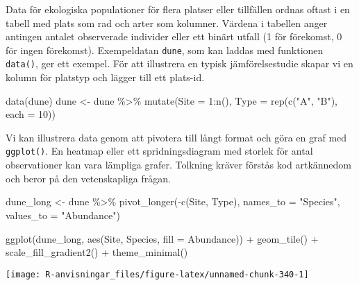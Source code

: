 \documentclass[
]{book}
\newenvironment{Shaded}{\begin{snugshade}}{\end{snugshade}}
\newcommand{\AttributeTok}[1]{\textcolor[rgb]{0.77,0.63,0.00}{#1}}
\newcommand{\DecValTok}[1]{\textcolor[rgb]{0.00,0.00,0.81}{#1}}
\newcommand{\FunctionTok}[1]{\textcolor[rgb]{0.00,0.00,0.00}{#1}}
\newcommand{\NormalTok}[1]{#1}
\newcommand{\OtherTok}[1]{\textcolor[rgb]{0.56,0.35,0.01}{#1}}
\newcommand{\SpecialCharTok}[1]{\textcolor[rgb]{0.00,0.00,0.00}{#1}}
\newcommand{\StringTok}[1]{\textcolor[rgb]{0.31,0.60,0.02}{#1}}
\theoremstyle{definition}
\theoremstyle{definition}
\theoremstyle{definition}
\theoremstyle{definition}
\theoremstyle{remark}
\begin{document}
Data för ekologiska populationer för flera platser eller tillfällen ordnas oftast i en tabell med plats som rad och arter som kolumner. Värdena i tabellen anger antingen antalet observerade individer eller ett binärt utfall (1 för förekomst, 0 för ingen förekomst). Exempeldatan \texttt{dune}, som kan laddas med funktionen \texttt{data()}, ger ett exempel. För att illustrera en typisk jämförelsestudie skapar vi en kolumn för platstyp och lägger till ett plats-id.

\begin{Shaded}
\begin{Highlighting}[]
\FunctionTok{data}\NormalTok{(dune)}
\NormalTok{dune }\OtherTok{\textless{}{-}}\NormalTok{ dune }\SpecialCharTok{\%\textgreater{}\%} 
  \FunctionTok{mutate}\NormalTok{(}\AttributeTok{Site =} \DecValTok{1}\SpecialCharTok{:}\FunctionTok{n}\NormalTok{(), }
         \AttributeTok{Type =} \FunctionTok{rep}\NormalTok{(}\FunctionTok{c}\NormalTok{(}\StringTok{"A"}\NormalTok{, }\StringTok{"B"}\NormalTok{), }\AttributeTok{each =} \DecValTok{10}\NormalTok{))}
\end{Highlighting}
\end{Shaded}

Vi kan illustrera data genom att pivotera till långt format och göra en graf med \texttt{ggplot()}. En heatmap eller ett spridningsdiagram med storlek för antal observationer kan vara lämpliga grafer. Tolkning kräver förstås kod artkännedom och beror på den vetenskapliga frågan.

\begin{Shaded}
\begin{Highlighting}[]
\NormalTok{dune\_long }\OtherTok{\textless{}{-}}\NormalTok{ dune }\SpecialCharTok{\%\textgreater{}\%}
  \FunctionTok{pivot\_longer}\NormalTok{(}\SpecialCharTok{{-}}\FunctionTok{c}\NormalTok{(Site, Type), }\AttributeTok{names\_to =} \StringTok{"Species"}\NormalTok{, }\AttributeTok{values\_to =} \StringTok{"Abundance"}\NormalTok{)}

\FunctionTok{ggplot}\NormalTok{(dune\_long, }\FunctionTok{aes}\NormalTok{(Site, Species, }\AttributeTok{fill =}\NormalTok{ Abundance)) }\SpecialCharTok{+}
  \FunctionTok{geom\_tile}\NormalTok{() }\SpecialCharTok{+}
  \FunctionTok{scale\_fill\_gradient2}\NormalTok{() }\SpecialCharTok{+}
  \FunctionTok{theme\_minimal}\NormalTok{()}
\end{Highlighting}
\end{Shaded}

\begin{center}\texttt{[image: R-anvisningar\_files/figure-latex/unnamed-chunk-340-1]} \end{center}
\end{document}
